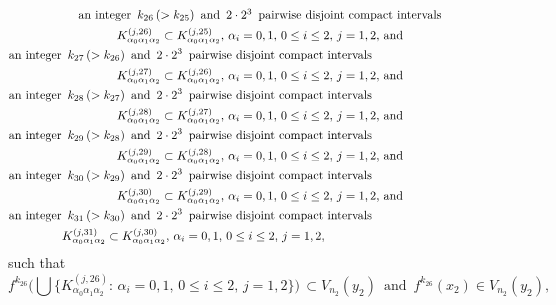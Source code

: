 \documentclass[12pt]{article}
\newcommand{\al}{\alpha}
\begin{document}
\begin{multline*}
$$
\text{an integer} \,\,\, k_{26} \, (> k_{25}) \,\,\, \text{and} \,\,\, 2 \cdot 2^3 \,\,\, \text{pairwise disjoint compact intervals} \\      K_{\al_0\al_1\al_2}^{(j,26)} \subset K_{\al_0\al_1\al_2}^{(j,25)}, \, \al_i = 0, 1, \, 0 \le i \le 2, \, j = 1, 2, \, \text{and} \\
\text{an integer} \,\,\, k_{27} \, (> k_{26}) \,\,\, \text{and} \,\,\, 2 \cdot 2^3 \,\,\, \text{pairwise disjoint compact intervals}\qquad\qquad\qquad\qquad\qquad\quad\,\,\, \\ 
K_{\al_0\al_1\al_2}^{(j,27)} \subset K_{\al_0\al_1\al_2}^{(j,26)}, \, \al_i = 0, 1, \, 0 \le i \le 2, \, j = 1, 2, \, \text{and}  \\
\text{an integer} \,\,\, k_{28} \, (> k_{27}) \,\,\, \text{and} \,\,\, 2 \cdot 2^3 \,\,\, \text{pairwise disjoint compact intervals}\qquad\qquad\qquad\qquad\qquad\quad\,\,\, \\      
K_{\al_0\al_1\al_2}^{(j,28)} \subset K_{\al_0\al_1\al_2}^{(j,27)}, \, \al_i = 0, 1, \, 0 \le i \le 2, \, j = 1, 2, \, \text{and} \\
\text{an integer} \,\,\, k_{29} \, (> k_{28}) \,\,\, \text{and} \,\,\, 2 \cdot 2^3 \,\,\, \text{pairwise disjoint compact intervals}\qquad\qquad\qquad\qquad\qquad\quad\,\,\, \\ 
K_{\al_0\al_1\al_2}^{(j,29)} \subset K_{\al_0\al_1\al_2}^{(j,28)}, \, \al_i = 0, 1, \, 0 \le i \le 2, \, j = 1, 2, \, \text{and}  \\
\text{an integer} \,\,\, k_{30} \, (> k_{29}) \,\,\, \text{and} \,\,\, 2 \cdot 2^3 \,\,\, \text{pairwise disjoint compact intervals}\qquad\qquad\qquad\qquad\qquad\quad\,\,\, \\ 
K_{\al_0\al_1\al_2}^{(j,30)} \subset K_{\al_0\al_1\al_2}^{(j,29)}, \, \al_i = 0, 1, \, 0 \le i \le 2, \, j = 1, 2, \, \text{and}  \\
\text{an integer} \,\,\, k_{31} \, (> k_{30}) \,\,\, \text{and} \,\,\, 2 \cdot 2^3 \,\,\, \text{pairwise disjoint compact intervals}\qquad\qquad\qquad\qquad\qquad\quad\,\,\, \\ 
K_{\al_0\al_1\al_2}^{(j,31)} \subset K_{\al_0\al_1\al_2}^{(j,30)}, \, \al_i = 0, 1, \, 0 \le i \le 2, \, j = 1, 2, \qquad\qquad\qquad\qquad\qquad\quad
$$
\end{multline*}
such that
$$
f^{k_{26}}\bigg(\bigcup \big\{ K_{\al_0\al_1\al_2}^{(j,26)}: \, \al_i = 0, 1, \, 0 \le i \le 2, \, j = 1, 2 \big\}\bigg) \, \subset V_{n_2}(y_2) \,\,\, \text{and} \,\,\, f^{k_{26}}(x_2) \in V_{n_2}(y_2),  
$$
\end{document}
